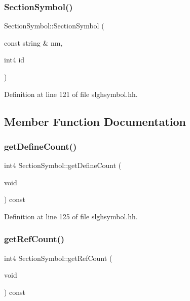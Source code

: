 \subsubsection{\texorpdfstring{SectionSymbol()}{SectionSymbol()}}
{\footnotesize\ttfamily Section\+Symbol\+::\+Section\+Symbol (\begin{DoxyParamCaption}\item[{const string \&}]{nm,  }\item[{int4}]{id }\end{DoxyParamCaption})\hspace{0.3cm}{\ttfamily [inline]}}



Definition at line 121 of file slghsymbol.\+hh.



\subsection{Member Function Documentation}
\mbox{\label{class_section_symbol_a4b5c352a6912f02788d6933ff921be84}} 
\subsubsection{\texorpdfstring{getDefineCount()}{getDefineCount()}}
{\footnotesize\ttfamily int4 Section\+Symbol\+::get\+Define\+Count (\begin{DoxyParamCaption}\item[{void}]{ }\end{DoxyParamCaption}) const\hspace{0.3cm}{\ttfamily [inline]}}



Definition at line 125 of file slghsymbol.\+hh.

\mbox{\label{class_section_symbol_a08815eb5d006d9f872f647498943501e}} 
\subsubsection{\texorpdfstring{getRefCount()}{getRefCount()}}
{\footnotesize\ttfamily int4 Section\+Symbol\+::get\+Ref\+Count (\begin{DoxyParamCaption}\item[{void}]{ }\end{DoxyParamCaption}) const\hspace{0.3cm}{\ttfamily [inline]}}



